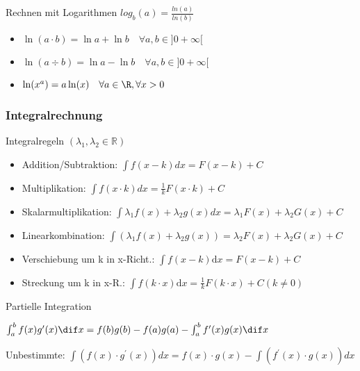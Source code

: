 \begin{concept}{Rechnen mit Logarithmen} $log_b (a) = \frac{ln(a)}{ln(b)}$
    \small
    \begin{itemize}
        \item $\ln (a \cdot b) = \ln a + \ln b \quad \forall a,b \in ]0 +  \infty[$
        \item $\ln (a \div b) = \ln a - \ln b \quad \forall a,b \in ]0 +  \infty[$
        \item ${\ln (x^a) = a \ln (x) \quad \forall a \in \R, \forall x > 0}$
    \end{itemize} 
\end{concept}


\raggedcolumns








\subsubsection{Integralrechnung}

\begin{concept}{Integralregeln} $(\lambda_1,\lambda_2 \in \mathbb{R} )$
    \begin{itemize}
      \item Addition/Subtraktion:
      $\int f(x-k) d x=F(x-k)+C$
      \item Multiplikation:
      $\int f(x \cdot k) d x=\frac{1}{k} F(x \cdot k)+C$
      \item Skalarmultiplikation:
      $\int \lambda_{1} f(x)+\lambda_{2} g(x) d x=\lambda_{1} F(x)+\lambda_{2} G(x)+C$
      \item Linearkombination: $\int{(\lambda_1f(x)+\lambda_2g(x))} = \lambda_2F(x)+\lambda_2G(x)+C$
      \item Verschiebung um k in x-Richt.: $\int{f(x-k)\mathrm{d}x}= F(x-k)+C$
      \item Streckung um k in x-R.: $\int{f(k\cdot x)\mathrm{d}x}= \frac{1}{k}F(k\cdot x)+C (k\neq0 )$
    \end{itemize}
\end{concept}


\begin{theorem}{Partielle Integration}

	$\int_a^b f(x) g'(x) \dif x = f(b) g(b) - f(a) g(a) - \int_a^b f'(x)g(x) \dif x$
   
   Unbestimmte:
   $
   \int(f(x) \cdot g^{\prime}(x)) d x=f(x) \cdot g(x)-\int(f^{\prime}(x) \cdot g(x)) d x
   $
\end{theorem}




